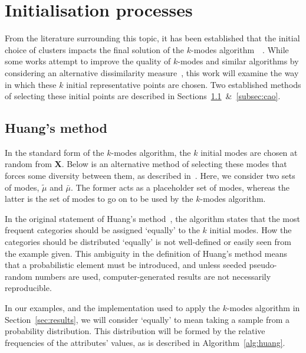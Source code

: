 \section{Initialisation processes}\label{sec:init}

From the literature surrounding this topic, it has been established that the 
initial choice of clusters impacts the final solution of the \(k\)-modes
algorithm~\cite{Huang98}~\cite{Cao09}. While some works attempt to improve the 
quality of \(k\)-modes and similar algorithms by considering an alternative 
dissimilarity measure~\cite{Ng07}, this work will examine the way in which these
\(k\) initial representative points are chosen. Two established methods of 
selecting these initial points are described in
Sections~\ref{subsec:huang}~\&~\ref{subsec:cao}.


\subsection{Huang's method}\label{subsec:huang}

In the standard form of the \(k\)-modes algorithm, the \(k\) initial modes are 
chosen at random from \textbf{X}. Below is an alternative method of selecting
these modes that forces some diversity between them, as described 
in~\cite{Huang98}. Here, we consider two sets of modes, \(\tilde{\mu}\) and
\(\bar{\mu}\). The former acts as a placeholder set of modes, whereas the latter
is the set of modes to go on to be used by the \(k\)-modes algorithm.

\begin{singlespace}
    
\end{singlespace}

In the original statement of Huang's method~\cite{Huang98}, the algorithm states
that the most frequent categories should be assigned `equally' to the \(k\) 
initial modes. How the categories should be distributed `equally' is not 
well-defined or easily seen from the example given. This ambiguity in the 
definition of Huang's method means that a probabilistic element must be 
introduced, and unless seeded pseudo-random numbers are used, computer-generated
results are not necessarily reproducible.

In our examples, and the implementation used to apply the \(k\)-modes algorithm
in Section~\ref{sec:results}, we will consider `equally' to mean taking a sample
from a probability distribution. This distribution will be formed by the
relative frequencies of the attributes' values, as is described in
Algorithm~\ref{alg:huang}.

